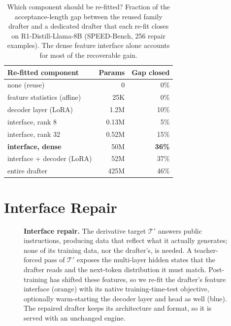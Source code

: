 \documentclass[11pt]{article}
\DeclareRobustCommand*\circled[1]{\tikz[baseline=(char.base)]{\node[shape=circle,draw,inner sep=0.8pt,font=\scriptsize\bfseries] (char) {#1};}}
\newcommand{\Tp}{\mathcal{T}'}
\newcommand{\Ours}{Interface repair}
\begin{document}
\begin{table}[t]
  \centering
  \small
  \setlength{\tabcolsep}{5pt}
  \begin{tabular}{@{}lrr@{}}
    \toprule
    Re-fitted component & Params & Gap closed \\
    \midrule
    none (reuse) & 0 & 0\% \\
    feature statistics (affine) & 25K & 0\% \\
    decoder layer (LoRA) & 1.2M & 10\% \\
    interface, rank 8 & 0.13M & 5\% \\
    interface, rank 32 & 0.52M & 15\% \\
    \textbf{interface, dense} & 50M & \textbf{36\%} \\
    interface + decoder (LoRA) & 52M & 37\% \\
    entire drafter & 425M & 46\% \\
    \bottomrule
  \end{tabular}
  \caption{Which component should be re-fitted? Fraction of the acceptance-length gap between the reused family drafter and a dedicated drafter that each re-fit closes on R1-Distill-Llama-8B (SPEED-Bench, 256 repair examples). The dense feature interface alone accounts for most of the recoverable gain.}
  \label{tab:components}
\end{table}

\section{Interface Repair}
\label{sec:method}

\begin{figure}[t]
  \centering
  \resizebox{\textwidth}{!}{}
  \caption{\textbf{\Ours{}.} \circled{1} The derivative target $\Tp$ answers public instructions, producing data that reflect what it actually generates; none of its training data, nor the drafter's, is needed. \circled{2} A teacher-forced pass of $\Tp$ exposes the multi-layer hidden states that the drafter reads and the next-token distribution it must match. Post-training has shifted these features, so we re-fit the drafter's feature interface (orange) with its native training-time-test objective, optionally warm-starting the decoder layer and head as well (blue). \circled{3} The repaired drafter keeps its architecture and format, so it is served with an unchanged engine.}
  \label{fig:method}
\end{figure}
\end{document}
